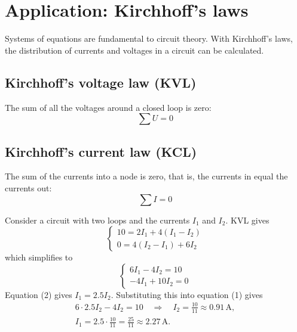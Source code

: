 \section{Application: Kirchhoff's laws}
\label{c4:sec:kirchhoff}
Systems of equations are fundamental to circuit theory. With Kirchhoff's laws, the distribution of
currents and voltages in a circuit can be calculated.

\subsection{Kirchhoff's voltage law (KVL)}
\label{c4:sec:kvl}
The sum of all the voltages around a closed loop is zero:
\[
  \sum U = 0
\]

\subsection{Kirchhoff's current law (KCL)}
\label{c4:sec:kcl}
The sum of the currents into a node is zero, that is, the currents in equal the currents out:
\[
  \sum I = 0
\]

\begin{exempel}
Consider a circuit with two loops and the currents $I_1$ and $I_2$. KVL gives
\[
  \begin{cases}
    10 = 2I_1 + 4(I_1 - I_2) \\
    0 = 4(I_2 - I_1) + 6I_2
  \end{cases}
\]
which simplifies to
\[
  \begin{cases}
    6I_1 - 4I_2 = 10 \\
    -4I_1 + 10I_2 = 0
  \end{cases}
\]
Equation (2) gives $I_1 = 2.5 I_2$. Substituting this into equation (1) gives
\begin{gather*}
  6 \cdot 2.5 I_2 - 4I_2 = 10 \quad \Rightarrow \quad I_2 = \frac{10}{11} \approx 0.91\,\text{A},
  \\
  I_1 = 2.5 \cdot \frac{10}{11} = \frac{25}{11} \approx 2.27\,\text{A}.
\end{gather*}
\end{exempel}
